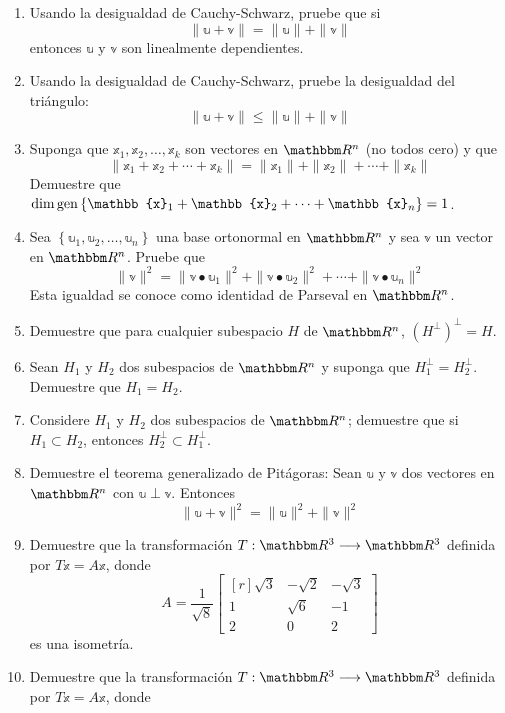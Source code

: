 \begin{enumerate}[start=27]
    \item Usando la desigualdad de Cauchy-Schwarz, pruebe que si
    $$\|\mathbb{u} + \mathbb{v}\| = \|\mathbb{u}\| + \|\mathbb{v}\|$$
    entonces $\mathbb{u}$ y $\mathbb{v}$ son linealmente dependientes.
    \item Usando la desigualdad de Cauchy-Schwarz, pruebe la desigualdad del triángulo:
    $$\|\mathbb{u}+\mathbb{v}\| \leq\|\mathbb{u}\|+\|\mathbb{v}\|$$
    \item Suponga que $\mathbb{x}_{1}, \mathbb{x}_{2}, \ldots, \mathbb{x}_{k}$ son vectores en $\RR[n]$ (no todos cero) y que
    $$\|\mathbb{x}_{1}+\mathbb{x}_{2}+\cdots+\mathbb{x}_{k}\|=\|\mathbb{x}_{1}\|+\|\mathbb{x}_{2}\|+\cdots+\|\mathbb{x}_{k}\|$$
    Demuestre que $\Dim \Gen \left\{\mathbb{x}_{1}+\mathbb{x}_{2}+\cdots+\mathbb{x}_{n}\right\}=1$.
    \item Sea $\left\{\mathbb{u}_{1}, \mathbb{u}_{2}, \dots, \mathbb{u}_{n}\right\}$ una base ortonormal en $\RR[n]$ y sea $\mathbb{v}$ un vector en $\RR[n]$. Pruebe que
    $$\|\mathbb{v}\|^{2}=\|\mathbb{v} \bullet \mathbb{u}_{1}\|^{2}+\|\mathbb{v} \bullet \mathbb{u}_{2}\|^{2}+\cdots+\|\mathbb{v} \bullet \mathbb{u}_{n}\|^{2}$$
    Esta igualdad se conoce como identidad de Parseval en $\RR[n]$.
    \item Demuestre que para cualquier subespacio $H$ de $\RR[n]$, $\left(H^{\perp}\right)^{\perp}=H$.
    \item Sean $H_{1}$ y $H_{2}$ dos subespacios de $\RR[n]$ y suponga que $H_{1}^{\perp}=H_{2}^{\perp}$. Demuestre que $H_{1}=H_{2}$.
    \item Considere $H_{1}$ y $H_{2}$ dos subespacios de $\RR[n]$; demuestre que si $H_{1} \subset H_{2}$, entonces $H_{2}^{\perp} \subset H_{1}^{\perp}$.
    \item Demuestre el teorema generalizado de Pitágoras: Sean $\mathbb{u}$ y $\mathbb{v}$ dos vectores en $\RR[n]$ con $\mathbb{u} \perp \mathbb{v}$. Entonces
    $$\|\mathbb{u}+\mathbb{v}\|^{2}=\|\mathbb{u}\|^{2}+\|\mathbb{v}\|^{2}$$
    \item Demuestre que la transformación $T: \RR[3] \longrightarrow \RR[3]$ definida por $T \mathbb{x}=A \mathbb{x}$, donde
    $$A = \frac{1}{\sqrt{8}} \begin{bmatrix*}[r]
        \sqrt{3} & -\sqrt{2} & -\sqrt{3} \\
        1 & \sqrt{6} & -1 \\
        2 & 0 & 2
    \end{bmatrix*}$$
    es una isometría.
    \item Demuestre que la transformación $T: \RR[3] \longrightarrow \RR[3]$ definida por $T \mathbb{x}=A \mathbb{x}$, donde

\end{enumerate}
